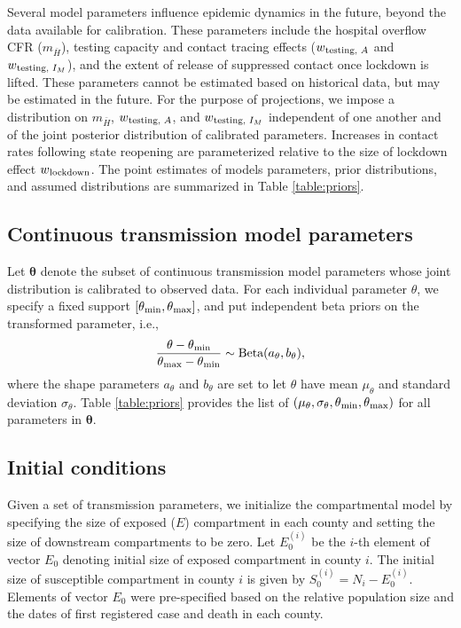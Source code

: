 \documentclass[11pt]{article}
\newcommand{\btheta}{\boldsymbol{\theta}}
\begin{document}
Several model parameters influence epidemic dynamics in the future, beyond the data available for calibration. These parameters include the hospital overflow CFR ($m_{\bar{H}}$), testing capacity and contact tracing effects ($w\textsubscript{testing, $A$}$ and $w\textsubscript{testing, $I_M$}$), and the extent of release of suppressed contact once lockdown is lifted. These parameters cannot be estimated based on historical data, but may be estimated in the future. For the purpose of projections, we impose a distribution on $m_{\bar{H}}$, $w\textsubscript{testing, $A$}$, and $w\textsubscript{testing, $I_M$}$ independent of one another and of the joint posterior distribution of calibrated parameters.  
Increases in contact rates following state reopening are parameterized relative to the size of lockdown effect $w\textsubscript{lockdown}$.
The point estimates of models parameters, prior distributions, and assumed distributions are summarized in Table \ref{table:priors}.


\subsection{Continuous transmission model parameters} 

Let $\btheta$ denote the subset of continuous transmission model parameters whose joint distribution is calibrated to observed data. For each individual parameter $\theta$, we specify a fixed support $[\theta\textsubscript{min}, \theta\textsubscript{max}]$, and put independent beta priors on the transformed parameter, i.e.,
\begin{equation}
\frac{\theta - \theta\textsubscript{min}}{\theta\textsubscript{max} - \theta\textsubscript{min}} \sim \mbox{Beta}(a_{\theta}, b_{\theta}),
\label{eq:truncdist}
\end{equation}    
where the shape parameters $a_{\theta}$ and $b_\theta$ are set to let $\theta$ have mean $\mu_\theta$ and standard deviation $\sigma_\theta$. Table \ref{table:priors} provides the list of $(\mu_\theta, \sigma_\theta, \theta\textsubscript{min}, \theta\textsubscript{max})$ for all parameters in $\btheta$. 


\subsection{Initial conditions}

Given a set of transmission parameters, we initialize the compartmental model by specifying the size of exposed ($E$) compartment in each county and setting the size of downstream compartments to be zero. Let $E_0^{(i)}$ be the $i$-th element of vector $E_0$ denoting initial size of exposed compartment in county $i$.   
The initial size of susceptible compartment in county $i$ is given by $S_0^{(i)} = N_i - E_0^{(i)}$. 
Elements of vector $E_0$ were pre-specified based on the relative population size and the dates of first registered case and death in each county. 
\end{document}
